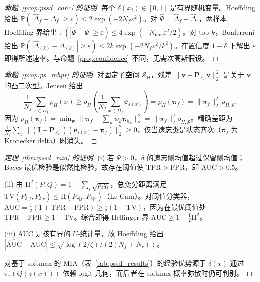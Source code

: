 \begin{proof}[命题~\ref{prop:pssd_conc} 的证明]
每个 $\delta(x_i)\in[0,1]$ 是有界随机变量。Hoeffding 给出 $\mathbb{P}(|\hat{\Delta}_f-\Delta_f|\ge\varepsilon) \le 2\exp(-2N_f\varepsilon^2)$。对 $\hat{\Psi}=\hat{\Delta}_f-\hat{\Delta}_r$，两样本 Hoeffding 界给出 $\mathbb{P}(|\hat{\Psi}-\Psi|\ge\varepsilon) \le 4\exp(-N_{\min}\varepsilon^2/2)$。对 top-$k$，Bonferroni 给出 $\mathbb{P}(|\hat{\Delta}_{(k)}-\Delta_{(k)}|\ge\varepsilon) \le 2k\exp(-2N_f\varepsilon^2/k^2)$。在置信度 $1-\delta$ 下解出 $\varepsilon$ 即得所述速率。与命题~\ref{prop:confidence} 不同，无需次高斯假设。
\end{proof}

\begin{proof}[命题~\ref{prop:ps_mhpr} 的证明]
对固定子空间 $\mathcal{S}_H$，残差 $\|\mathbf{v}-\mathbf{P}_{\mathcal{S}_H}\mathbf{v}\|_2^2$ 是关于 $\mathbf{v}$ 的凸二次型。Jensen 给出
\[
\frac1{N_f}\sum_{x\in D_f}\rho_H(x) \ge \rho_H\!\left(\frac1{N_f}\sum_{x\in D_f}\mathbf{e}_{s(x)}\right) = \rho_H(\boldsymbol{\pi}_f) = \|\boldsymbol{\pi}_f\|_2^2\,\rho_{H,\mathcal{S}},
\]
因为 $\rho_H(\boldsymbol{\pi}_f)=\min_{\mathbf{w}}\|\boldsymbol{\pi}_f-\sum_k w_k\boldsymbol{\pi}_{h_k}\|_2^2=\|\boldsymbol{\pi}_f\|_2^2\rho_{H,\mathcal{S}}$。精确差距为 $\frac1{N_f}\sum_x\|(\mathbf{I}-\mathbf{P}_{\mathcal{S}_H})(\mathbf{e}_{s(x)}-\boldsymbol{\pi}_f)\|_2^2\ge0$，仅当遗忘类是状态齐次（$\boldsymbol{\pi}_f$ 为 Kronecker delta）时消失。
\end{proof}

\begin{proof}[定理~\ref{thm:pssd_mia} 的证明]
(i) 若 $\Psi>0$，$\delta$ 的遗忘侧均值超过保留侧均值；Bayes 最优检验是似然比检验，故存在阈值使 $\mathrm{TPR}>\mathrm{FPR}$，即 $\mathrm{AUC}>0.5$。

(ii) 由 $\mathrm{H}^2(P,Q)=1-\sum_i\sqrt{p_iq_i}$，总变分距离满足 $\mathrm{TV}(P_{\delta|f},P_{\delta|r})\le\mathrm{H}(P_{\delta|f},P_{\delta|r})$（Le Cam）。对阈值分类器，$\mathrm{AUC}=\frac12(1+\mathrm{TPR}-\mathrm{FPR})\ge\frac12(1-\mathrm{TV})$，因为在最优阈值处 $\mathrm{TPR}-\mathrm{FPR}\ge1-\mathrm{TV}$。综合即得 Hellinger 界 $\mathrm{AUC}\ge1-\frac12\mathrm{H}^2$。

(iii) AUC 是核有界的 $U$-统计量，故 Hoeffding 给出 $|\widehat{\mathrm{AUC}}-\mathrm{AUC}|\le\sqrt{\log(2/\zeta)/(2(N_f+N_r))}$。

对基于 softmax 的 MIA（表~\ref{tab:pssd_results}）的经验优势源于 $\delta(x)$ 通过 $\pi_r(Q(z(x)))$ 依赖 logit 几何，而后者在 softmax 概率弥散时仍可判别。
\end{proof}

